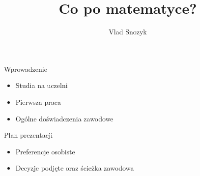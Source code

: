 \documentclass{beamer}
\title{Co po matematyce?}
\author{Vlad Snozyk}
\date{}
\begin{document}
\begin{frame}
  \titlepage
\end{frame}

\begin{frame}{Wprowadzenie}
  \begin{itemize}
    \item Studia na uczelni
    \item Pierwsza praca
    \item Ogólne doświadczenia zawodowe
  \end{itemize}
\end{frame}

\begin{frame}{Plan prezentacji}
  \begin{itemize}
    \item Preferencje osobiste
    \item Decyzje podjęte oraz ścieżka zawodowa
  \end{itemize}
\end{frame}
\end{document}
